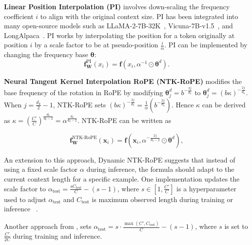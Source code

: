 \documentclass{article}
\begin{document}
\textbf{Linear Position Interpolation (PI)} involves down-scaling the frequency coefficient $i$ to align with the original context size. PI has been integrated into many open-source models such as LLaMA-2-7B-32K~\citep{together-instruct}, Vicuna-7B-v1.5~\citep{vicuna2023}, and LongAlpaca~\citep{chen2023longlora}. PI works by interpolating the position for a token originally at position $i$ by a scale factor to be at pseudo-position $\frac{i}{\alpha}$.
 PI can be implemented by changing the frequency base $\bm{\theta}$:
\begin{equation}
\mathbf{f}_\mathbf{W}^{\text{PI}}(x_i) = \mathbf{f}(x_i, \alpha^{-1} \odot \bm{\theta}^d).
\end{equation}


\textbf{Neural Tangent Kernel Interpolation RoPE (NTK-RoPE) } modifies the base frequency of the rotation in RoPE by modifying $\bm{\theta}^d_j = b^{-\frac{2j}{d_k}}$ to $\bm{\theta}^d_j = (b\kappa)^{-\frac{2j}{d_k}}$.  When $j= \frac{d_k}{2}-1$, NTK-RoPE sets  $(b\kappa)^{-\frac{2j}{d_k}} = \frac{1}{\alpha} (b^{-\frac{2j}{d_k}})$.  Hence $\kappa$ can be derived as  $\kappa = (\frac{C'}{C})^{\frac{d_k}{d_k-2}} = \alpha^{\frac{d_k}{d_k-2}}$. NTK-RoPE can be written as 

\begin{equation}
 \mathbf{f}_\mathbf{W}^{\text{NTK-RoPE}}(\mathbf{x}_i) = \mathbf{f}(\mathbf{x}_i,   \alpha^{-\frac{2j}{d_k-2}} \odot \bm{\theta}^d),
\end{equation}

An extension to this approach, Dynamic NTK-RoPE suggests that instead of using a fixed scale factor $\alpha$ during inference, the formula should adapt to the current context length for a specific example. One implementation updates the scale factor to $\alpha_{\text{test}} = \frac{s C_\text{test}}{C} - (s - 1)$, where $s \in [1, \frac{C'}{C}]$ is a hyperparameter used to adjust $\alpha_{\text{test}}$ and $C_\text{test}$ is maximum observed length during training or inference ~\citep{fu2024data}.

Another approach from \citep{fu2024data}, sets $\alpha_{\text{test}} = s \cdot \frac{\max(C', C_\text{test})}{C}-(s-1)$, where $s$ is set to $\frac{C'}{2C}$ during training and inference.



\end{document}

